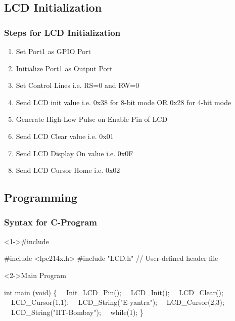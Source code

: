 \documentclass[10pt,red]{beamer}
\begin{document}
\subsection{LCD Initialization}
\begin{frame}
	\frametitle{Steps for LCD Initialization} \pause
	\begin{enumerate}
		\item <+-|alert@+> Set Port1 as GPIO Port \\[8pt]
		\item <+-|alert@+> Initialize Port1 as Output Port \\[8pt]
		\item <+-|alert@+> Set  Control Lines   i.e.	RS=0 and RW=0 \\[8pt]
		\item <+-|alert@+> Send LCD init value i.e. 0x38 for 8-bit mode OR 0x28 for 4-bit mode \\[8pt]
		\item <+-|alert@+> Generate High-Low Pulse on Enable Pin of LCD \\[8pt]
		\item <+-|alert@+> Send LCD Clear value i.e. 0x01 \\[8pt]
		\item <+-|alert@+> Send LCD Display On value i.e. 0x0F \\[8pt]
		\item <+-|alert@+> Send LCD Cursor Home i.e. 0x02	\\[8pt]
	\end{enumerate}
\end{frame}

\subsection{Programming}
\begin{frame}[shrink = 2,fragile] 
	\frametitle{Syntax for C-Program}\pause
	
		\begin{block}<1->{\#include}\pause
		\begin{semiverbatim}
				#include <lpc214x.h>
				#include "LCD.h"                // User-defined header file
 		\end{semiverbatim}
		\end{block} \pause
		
	\begin{block}<2->{Main Program}\pause
		\begin{semiverbatim}
				int main (void) 
				\{
			\ \    Init_LCD_Pin();
			\ \    LCD_Init();
			\ \    LCD_Clear();
			\ \    LCD_Cursor(1,1);
			\ \    LCD_String("E-yantra");
			\ \    LCD_Cursor(2,3);
			\ \    LCD_String("IIT-Bombay");
			\ \	   while(1);	
				\}	
 		\end{semiverbatim}
		\end{block}	
\end{frame}
\end{document}
